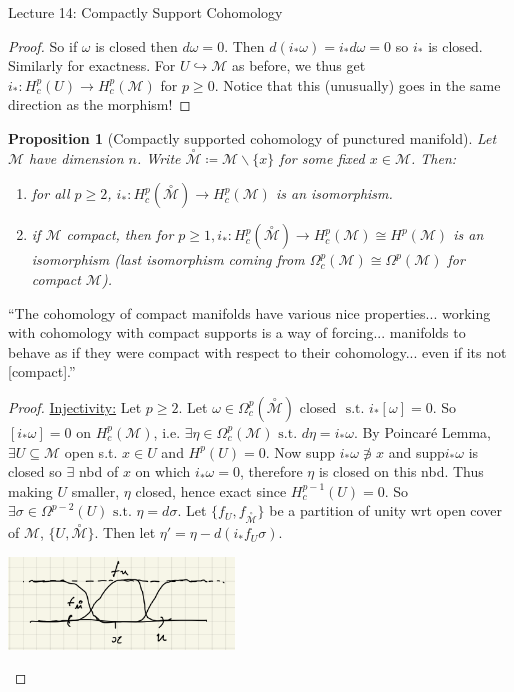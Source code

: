 \documentclass[10pt]{article}
\theoremstyle{plain}
\newtheorem{prop}[thm]{Proposition}
\theoremstyle{definition}
\newcommand{\st}{\text{ s.t. }}
\newcommand{\man}{\mathcal{M}}
\newcommand{\xman}{x\in\man}
\newcommand{\pformman}[1]{\Omega^{#1}(\man)}
\newcommand{\compactpformman}[1]{\Omega^{#1}_c(\man)}
\newcommand{\deriv}{d}
\newcommand{\dw}{d\omega}
\newcommand{\deta}{\deriv\eta}
\newcommand{\cohomman}[1]{H^{#1}(\man)}
\newcommand{\compactcohomman}[1]{H_c^{#1}(\man)}
\newcommand{\puncman}{\overset{\circ}{\man}}
\begin{document}
\begin{section}{Lecture 14: Compactly Support Cohomology}
\begin{proof}
So if $\omega$ is closed then $\dw = 0.$ Then $d(i_*\omega) = i_* \dw = 0$ so $i_*$ is closed. Similarly for exactness. For $U \hookrightarrow \man $ as before, we thus get $i_* : H^p_c(U) \to H^p_c(\man)$ for $p \geq 0$. Notice that this (unusually) goes in the same direction as the morphism!
\end{proof}
\begin{prop}[Compactly supported cohomology of punctured manifold]
Let $\man $ have dimension $n$. Write $\puncman \coloneqq \man \backslash \{x\}$ for some fixed $\xman$. Then:\begin{enumerate}
    \item for all $p \geq 2$, $i_* : H^p_c(\puncman) \to \compactcohomman{p}$ is an isomorphism.
    \item if $\man$ compact, then for $p\geq 1, i_* : H_c^p(\puncman) \to \compactcohomman{p} \cong\cohomman{p}$ is an isomorphism (last isomorphism coming from $\compactpformman{p} \cong \pformman{p}$ for compact $\man$).
\end{enumerate}
\end{prop}
``The cohomology of compact manifolds have various nice properties... working with cohomology with compact supports is a way of forcing... manifolds to behave as if they were compact with respect to their cohomology... even if its not [compact].''
\begin{proof}
\underline{Injectivity:} Let $p\geq 2$. Let $\omega \in \Omega_c^p(\puncman)$ closed $\st i_*[\omega] = 0.$ So $[i_* \omega] = 0$ on $\compactcohomman{p}$, i.e. $\exists \eta \in \compactpformman{p} \st \deta = i_* \omega.$ By Poincar\'e Lemma, $\exists U \subseteq \man$ open s.t. $x\in U$ and $H^p(U) = 0.$ Now supp $i_*\omega \not\ni x$ and supp$i_* \omega$ is closed so $\exists$ nbd of $x$ on which $i_*\omega = 0$, therefore $\eta$ is closed on this nbd. Thus making $U$ smaller, $\eta$ closed, hence exact since $H^{p-1}_c(U) = 0$. So $\exists \sigma  \in \Omega^{p-2}(U) \st \eta = \deriv \sigma$. Let $\{f_U, f_{\puncman}\}$ be a partition of unity wrt open cover of $\man$, $\{U,\puncman\}$. Then let $\eta' = \eta - \deriv(i_*f_U \sigma)$.
\begin{center}\includegraphics[width=0.45\textwidth]{PuncturedManifoldProposition.png}\end{center}

\end{proof}
\end{section}
\end{document}
